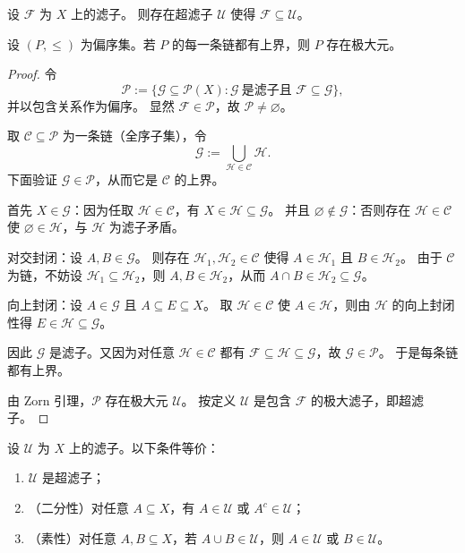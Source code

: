 \documentclass[lang=cn,a4paper,newtx,section]{elegantbook}
\begin{document}
\begin{theorem}[任意滤子可扩张为超滤子]
设 $\mathcal F$ 为 $X$ 上的滤子。
则存在超滤子 $\mathcal U$ 使得 $\mathcal F\subseteq\mathcal U$。
\end{theorem}

\begin{lemma}[Zorn 引理]
设 $(P,\le)$ 为偏序集。若 $P$ 的每一条链都有上界，则 $P$ 存在极大元。
\end{lemma}

\begin{proof}
令
\[
  \mathscr P:=\{\mathcal G\subseteq\mathcal P(X): \mathcal G\ \text{是滤子且 }\mathcal F\subseteq\mathcal G\},
\]
并以包含关系作为偏序。
显然 $\mathcal F\in\mathscr P$，故 $\mathscr P\neq\varnothing$。

取 $\mathscr C\subseteq\mathscr P$ 为一条链（全序子集），令
\[
  \mathcal G:=\bigcup_{\mathcal H\in\mathscr C}\mathcal H.
\]
下面验证 $\mathcal G\in\mathscr P$，从而它是 $\mathscr C$ 的上界。

首先 $X\in\mathcal G$：因为任取 $\mathcal H\in\mathscr C$，有 $X\in\mathcal H\subseteq\mathcal G$。
并且 $\varnothing\notin\mathcal G$：否则存在 $\mathcal H\in\mathscr C$ 使 $\varnothing\in\mathcal H$，与 $\mathcal H$ 为滤子矛盾。

对交封闭：设 $A,B\in\mathcal G$。
则存在 $\mathcal H_1,\mathcal H_2\in\mathscr C$ 使得 $A\in\mathcal H_1$ 且 $B\in\mathcal H_2$。
由于 $\mathscr C$ 为链，不妨设 $\mathcal H_1\subseteq\mathcal H_2$，则 $A,B\in\mathcal H_2$，从而 $A\cap B\in\mathcal H_2\subseteq\mathcal G$。

向上封闭：设 $A\in\mathcal G$ 且 $A\subseteq E\subseteq X$。
取 $\mathcal H\in\mathscr C$ 使 $A\in\mathcal H$，则由 $\mathcal H$ 的向上封闭性得 $E\in\mathcal H\subseteq\mathcal G$。

因此 $\mathcal G$ 是滤子。又因为对任意 $\mathcal H\in\mathscr C$ 都有 $\mathcal F\subseteq\mathcal H\subseteq\mathcal G$，故 $\mathcal G\in\mathscr P$。
于是每条链都有上界。

由 Zorn 引理，$\mathscr P$ 存在极大元 $\mathcal U$。
按定义 $\mathcal U$ 是包含 $\mathcal F$ 的极大滤子，即超滤子。
\end{proof}

\begin{theorem}[超滤子的等价刻画]
设 $\mathcal U$ 为 $X$ 上的滤子。以下条件等价：
\begin{enumerate}
  \item $\mathcal U$ 是超滤子；
  \item （二分性）对任意 $A\subseteq X$，有 $A\in\mathcal U$ 或 $A^{c}\in\mathcal U$；
  \item （素性）对任意 $A,B\subseteq X$，若 $A\cup B\in\mathcal U$，则 $A\in\mathcal U$ 或 $B\in\mathcal U$。
\end{enumerate}
\end{theorem}
\end{document}
